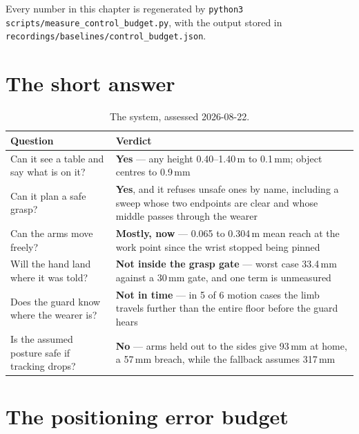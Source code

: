 \documentclass[11pt,a4paper,oneside]{report}
\newcommand{\code}[1]{\texttt{\small #1}}
\newcommand{\file}[1]{\texttt{\small #1}}
\begin{document}
Every number in this chapter is regenerated by
\code{python3 scripts/measure\_control\_budget.py}, with the output stored in
\file{recordings/baselines/control\_budget.json}.

\section{The short answer}

\begin{table}[H]
\centering
\small
\begin{tabularx}{\textwidth}{@{}p{}X@{}}
\toprule
\textbf{Question} & \textbf{Verdict} \\
\midrule
Can it see a table and say what is on it? & \textbf{Yes} --- any height
0.40--1.40\,m to 0.1\,mm; object centres to 0.9\,mm \\
Can it plan a safe grasp? & \textbf{Yes}, and it refuses unsafe ones by name,
including a sweep whose two endpoints are clear and whose middle passes through
the wearer \\
Can the arms move freely? & \textbf{Mostly, now} --- 0.065 to 0.304\,m mean
reach at the work point since the wrist stopped being pinned \\
Will the hand land where it was told? & \textbf{Not inside the grasp gate} ---
worst case 33.4\,mm against a 30\,mm gate, and one term is unmeasured \\
Does the guard know where the wearer is? & \textbf{Not in time} --- in 5 of 6
motion cases the limb travels further than the entire floor before the guard
hears \\
Is the assumed posture safe if tracking drops? & \textbf{No} --- arms held out
to the sides give 93\,mm at home, a 57\,mm breach, while the fallback assumes
317\,mm \\
\bottomrule
\end{tabularx}
\caption{The system, assessed 2026-08-22.}
\end{table}

\section{The positioning error budget}
\end{document}
